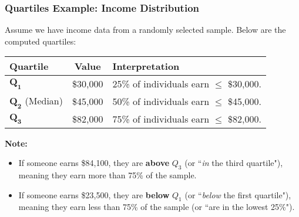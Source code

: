 \documentclass[handout]{beamer} %
\begin{document}
\begin{frame}
\frametitle{Quartiles Example: Income Distribution}

Assume we have income data from a randomly selected sample. Below are the computed quartiles:

\vspace{1em}

{\centering
\begin{tabular}{|l|c|p{6cm}|}
\hline
\textbf{Quartile} & \textbf{Value} & \textbf{Interpretation} \\
\hline
\(\mathbf{Q_1}\)      & \$30{,}000 & 25\% of individuals earn \(\le\) \$30{,}000. \\
\(\mathbf{Q_2}\) (Median) & \$45{,}000 & 50\% of individuals earn \(\le\) \$45{,}000. \\
\(\mathbf{Q_3}\)      & \$82{,}000 & 75\% of individuals earn \(\le\) \$82{,}000. \\
\hline
\end{tabular}
\par
}
\vspace{1em} \pause %
\textbf{Note:} 
\begin{itemize}
    \item If someone earns \$84{,}100, they are \textbf{above} \(Q_3\) (or ``\emph{in} the third quartile"), meaning they earn more than 75\% of the sample.
    \item If someone earns \$23{,}500, they are \textbf{below} \(Q_1\) (or ``\emph{below} the first quartile"), meaning they earn less than 75\% of the sample (or ``are in the lowest 25\%"). 
\end{itemize}


\end{frame}
\end{document}

